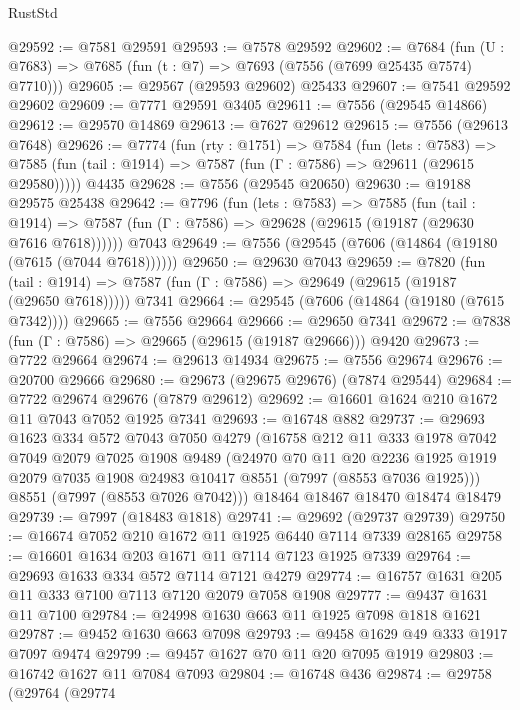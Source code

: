 \begin{lexlean}{RustStd}
\begin{coremodule}
{\begin{coremodule}
{{{{{{{{{{{{{{{{{{{{{{{{{{{{{{{{{{{{{{{{{{{@29592 := @7581 @29591
@29593 := @7578 @29592
@29602 := @7684
    (fun (U : @7683) => @7685 (fun (t : @7) => @7693 (@7556 (@7699 @25435 @7574) @7710)))
@29605 := @29567 (@29593 @29602) @25433
@29607 := @7541 @29592 @29602
@29609 := @7771 @29591 @3405
@29611 := @7556 (@29545 @14866)
@29612 := @29570 @14869
@29613 := @7627 @29612
@29615 := @7556 (@29613 @7648)
@29626 := @7774
    (fun (rty : @1751) =>
    @7584
      (fun (lets : @7583) =>
      @7585 (fun (tail : @1914) => @7587 (fun (Γ : @7586) => @29611 (@29615 @29580)))))
    @4435
@29628 := @7556 (@29545 @20650)
@29630 := @19188 @29575 @25438
@29642 := @7796
    (fun (lets : @7583) =>
    @7585
      (fun (tail : @1914) =>
      @7587 (fun (Γ : @7586) => @29628 (@29615 (@19187 (@29630 @7616 @7618))))))
    @7043
@29649 := @7556 (@29545 (@7606 (@14864 (@19180 (@7615 (@7044 @7618))))))
@29650 := @29630 @7043
@29659 := @7820
    (fun (tail : @1914) => @7587 (fun (Γ : @7586) => @29649 (@29615 (@19187 (@29650 @7618)))))
    @7341
@29664 := @29545 (@7606 (@14864 (@19180 (@7615 @7342))))
@29665 := @7556 @29664
@29666 := @29650 @7341
@29672 := @7838 (fun (Γ : @7586) => @29665 (@29615 (@19187 @29666))) @9420
@29673 := @7722 @29664
@29674 := @29613 @14934
@29675 := @7556 @29674
@29676 := @20700 @29666
@29680 := @29673 (@29675 @29676) (@7874 @29544)
@29684 := @7722 @29674 @29676 (@7879 @29612)
@29692 := @16601 @1624 @210 @1672 @11 @7043 @7052 @1925 @7341
@29693 := @16748 @882
@29737 := @29693
    @1623
    @334
    @572
    @7043
    @7050
    @4279
    (@16758
      @212
      @11
      @333
      @1978
      @7042
      @7049
      @2079
      @7025
      @1908
      @9489
      (@24970
        @70
        @11
        @20
        @2236
        @1925
        @1919
        @2079
        @7035
        @1908
        @24983
        @10417
        @8551
        (@7997 (@8553 @7036 @1925)))
      @8551
      (@7997 (@8553 @7026 @7042)))
    @18464
    @18467
    @18470
    @18474
    @18479
@29739 := @7997 (@18483 @1818)
@29741 := @29692 (@29737 @29739)
@29750 := @16674 @7052 @210 @1672 @11 @1925 @6440 @7114 @7339 @28165
@29758 := @16601 @1634 @203 @1671 @11 @7114 @7123 @1925 @7339
@29764 := @29693 @1633 @334 @572 @7114 @7121 @4279
@29774 := @16757 @1631 @205 @11 @333 @7100 @7113 @7120 @2079 @7058 @1908
@29777 := @9437 @1631 @11 @7100
@29784 := @24998 @1630 @663 @11 @1925 @7098 @1818 @1621
@29787 := @9452 @1630 @663 @7098
@29793 := @9458 @1629 @49 @333 @1917 @7097 @9474
@29799 := @9457 @1627 @70 @11 @20 @7095 @1919
@29803 := @16742 @1627 @11 @7084 @7093
@29804 := @16748 @436
@29874 := @29758
    (@29764
      (@29774
}}}}}}}}}}}}}}}}}}}}}}}}}}}}}}}}}}}}}}}}}}}
\end{coremodule}}
\end{coremodule}
\end{lexlean}
